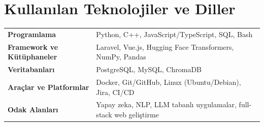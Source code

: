 \section*{Kullanılan Teknolojiler ve Diller}
\begin{tabular}{@{}p{5cm} p{11cm}@{}}
    \textbf{Programlama} & Python, C++, JavaScript/TypeScript, SQL, Bash \\[0.2cm]
    \textbf{Framework ve Kütüphaneler} & Laravel, Vue.js, Hugging Face Transformers, NumPy, Pandas \\[0.2cm]
    \textbf{Veritabanları} & PostgreSQL, MySQL, ChromaDB \\[0.2cm]
    \textbf{Araçlar ve Platformlar} & Docker, Git/GitHub, Linux (Ubuntu/Debian), Jira, CI/CD \\[0.2cm]
    \textbf{Odak Alanları} & Yapay zeka, NLP, LLM tabanlı uygulamalar, full-stack web geliştirme \\
\end{tabular}
